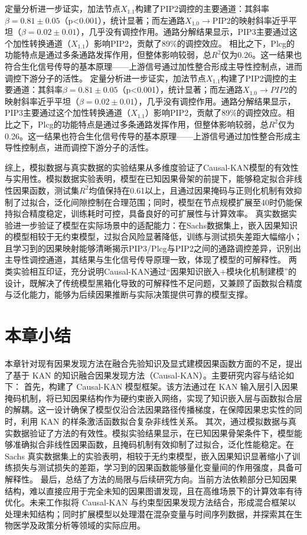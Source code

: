 定量分析进一步证实，加法节点$X_{1.1}$构建了PIP2调控的主要通道：其斜率$\beta=0.81\pm0.05$（p<0.001），统计显著；而左通路$X_{1.0}\rightarrow$PIP2的映射斜率近乎平坦（$\beta=0.02\pm0.01$），几乎没有调控作用。通路分解结果显示，PIP3主要通过这个加性转换通道（$X_{1.1}$）影响PIP2，贡献了89\%的调控效应。
相比之下，Plcg的功能特点是通过多条通路发挥作用，但整体影响较弱，总$R^2$仅为0.26。这一结果也符合生化信号传导的基本原理——上游信号通过加性整合形成主导性控制点，进而调控下游分子的活性。 定量分析进一步证实，加法节点$X_{1.1}$构建了PIP2调控的主要通道：其斜率$\beta=0.81\pm0.05$（p<0.001），统计显著；而左通路$X_{1.0}\rightarrow PIP2$的映射斜率近乎平坦（$\beta=0.02\pm0.01$），几乎没有调控作用。通路分解结果显示，PIP3主要通过这个加性转换通道（$X_{1.1}$）影响PIP2，贡献了89\%的调控效应。相比之下，Plcg的功能特点是通过多条通路发挥作用，但整体影响较弱，总$R^2$仅为0.26。这一结果也符合生化信号传导的基本原理——上游信号通过加性整合形成主导性控制点，进而调控下游分子的活性。

综上，模拟数据与真实数据的实验结果从多维度验证了Causal-KAN模型的有效性与实用性。模拟数据实验表明，模型在已知因果骨架的前提下，能够稳定拟合非线性因果函数，测试集$R^2$均值保持在0.61以上，且通过因果掩码与正则化机制有效抑制了过拟合，泛化间隙控制在合理范围；同时，模型在节点规模扩展至40时仍能保持拟合精度稳定，训练耗时可控，具备良好的可扩展性与计算效率。
真实数据实验进一步验证了模型在实际场景中的适配能力：在Sachs数据集上，嵌入因果知识的模型相较于无约束模型，过拟合风险显著降低，训练与测试损失差距大幅缩小；且学习到的因果映射能够清晰揭示PIP3/Plcg与PIP2之间的通路调控差异，识别出主导性调控通道，其结果与生化信号传导原理一致，体现了模型的可解释性。
两类实验相互印证，充分说明Causal-KAN通过“因果知识嵌入+模块化机制建模”的设计，既解决了传统模型黑箱化导致的可解释性不足问题，又兼顾了函数拟合精度与泛化能力，能够为后续因果推断与实际决策提供可靠的模型支撑。

\section{本章小结}
本章针对现有因果发现方法在融合先验知识及显式建模因果函数方面的不足，提出了基于 KAN 的知识融合因果发现方法（Causal-KAN）。主要研究内容与结论如下：
首先，构建了 Causal-KAN 模型框架。该方法通过在 KAN 输入层引入因果掩码机制，将已知因果结构作为硬约束嵌入网络，实现了知识嵌入层与函数拟合层的解耦。这一设计确保了模型仅沿合法因果路径传播梯度，在保障因果忠实性的同时，利用 KAN 的样条激活函数拟合复杂非线性关系。
其次，通过模拟数据与真实数据验证了方法的有效性。模拟实验结果显示，在已知因果骨架条件下，模型能够准确拟合非线性因果函数，且掩码机制有效抑制了过拟合，泛化性能稳定。在 Sachs 真实数据集上的实验表明，相较于无约束模型，嵌入因果知识显著缩小了训练损失与测试损失的差距，学习到的因果函数能够量化变量间的作用强度，具备可解释性。
最后，总结了方法的局限与后续研究方向。当前方法依赖部分已知因果结构，难以直接应用于完全未知的因果图谱发现，且在高维场景下的计算效率有待优化。未来工作拟将 Causal-KAN 与约束型因果发现方法结合，形成混合框架以处理未知结构；同时扩展模型以处理潜在混杂变量与时间序列数据，并探索其在生物医学及政策分析等领域的实际应用。